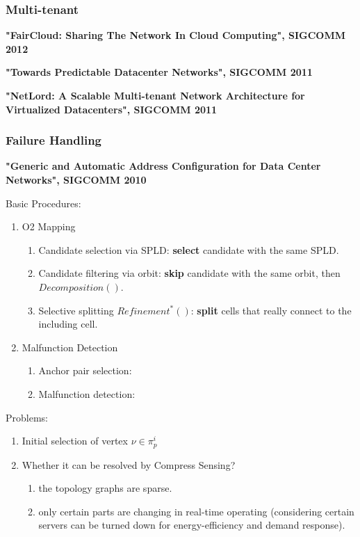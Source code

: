 \documentclass[journal,onecolumn,11pt]{IEEEtran}
\begin{document}
\subsubsection{Multi-tenant}

\textbf{"FairCloud: Sharing The Network In Cloud Computing", SIGCOMM 2012}

\textbf{"Towards Predictable Datacenter Networks", SIGCOMM 2011}

\textbf{"NetLord: A Scalable Multi-tenant Network Architecture for Virtualized Datacenters", SIGCOMM 2011}

\subsubsection{Failure Handling}

\textbf{"Generic and Automatic Address Configuration for Data Center Networks", SIGCOMM 2010}

Basic Procedures:
\begin{enumerate}
  \item O2 Mapping
  \begin{enumerate}
    \item Candidate selection via SPLD: \textbf{select} candidate with the same SPLD.
    \item Candidate filtering via orbit: \textbf{skip} candidate with the same orbit, then $Decomposition()$.
    \item Selective splitting $Refinement^*()$: \textbf{split} cells that really connect to the including cell.
  \end{enumerate}
  \item Malfunction Detection
  \begin{enumerate}
    \item Anchor pair selection:
    \item Malfunction detection:
  \end{enumerate}
\end{enumerate}

Problems:
\begin{enumerate}
  \item Initial selection of vertex $\nu\in\pi_p^i$
  \item Whether it can be resolved by Compress Sensing?
  \begin{enumerate}
    \item the topology graphs are sparse.
    \item only certain parts are changing in real-time operating (considering certain servers can be turned down for energy-efficiency and demand response).
  \end{enumerate}
\end{enumerate}
\end{document}
